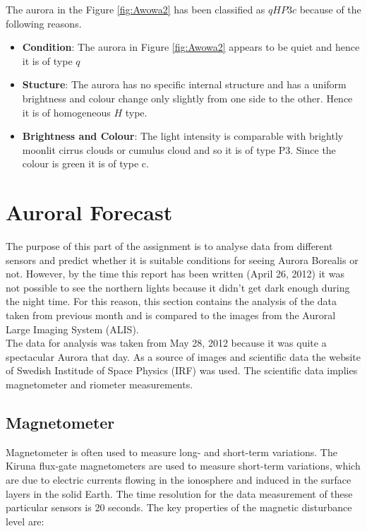 \documentclass{article}
\begin{document}
The aurora in the Figure \ref{fig:Awowa2} has been classified as $qHP3c$ because of the following reasons.

\begin{itemize}
\item \textbf{Condition}:  The aurora in Figure \ref{fig:Awowa2} appears to be quiet and hence it is of type $ q $ 
\item \textbf{Stucture}: The aurora has no specific internal structure and has a uniform brightness and colour change only slightly from one side to the other. Hence it is of homogeneous $ H $ type. 
\item \textbf{Brightness and Colour}: The light intensity is comparable with brightly moonlit cirrus clouds or cumulus cloud and so it is of type P3. Since the colour is green it is of type c.
\end{itemize}


\section{Auroral Forecast}

The purpose of this part of the assignment is to analyse data from different sensors and predict whether it is suitable conditions for seeing Aurora Borealis or not. However, by the time this report has been written (April 26, 2012) it was not possible to see the northern lights because it didn't get dark enough during the night time. For this reason, this section contains the analysis of the data taken from previous month and is compared to the images from the Auroral Large Imaging System (ALIS).
\\
The data for analysis was taken from May 28, 2012 because it was quite a spectacular Aurora that day. As a source of images and scientific data the website of Swedish Institude of Space Physics (IRF) was used. The scientific data implies magnetometer and riometer measurements.

\subsection{Magnetometer}
Magnetometer is often used to measure long- and short-term variations. The Kiruna flux-gate magnetometers are used to measure short-term variations, which are due to electric currents flowing in the ionosphere and induced in the surface layers in the solid Earth. The time resolution for the data measurement of these particular sensors is 20 seconds. The key properties of the magnetic disturbance level are:
\end{document}
